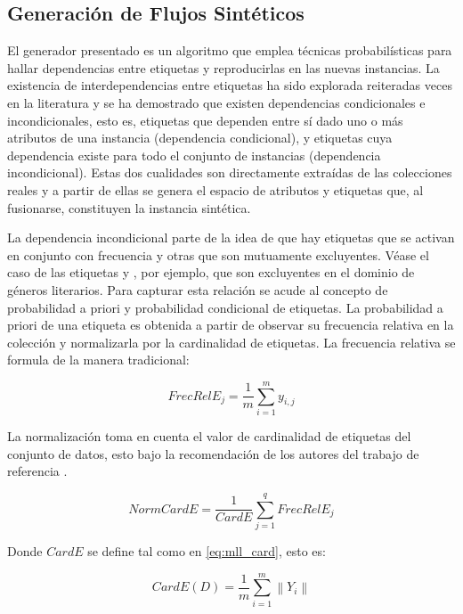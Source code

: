 \subsection{Generación de Flujos Sintéticos}
\label{generacion_flujos_sinteticos}

El generador presentado es un algoritmo que emplea técnicas probabilísticas para
hallar dependencias entre etiquetas y reproducirlas en las nuevas instancias. La
existencia de interdependencias entre etiquetas ha sido explorada reiteradas
veces en la literatura \cite{tsoumakas_multi-label_2007, read_multi-label_2008}
y se ha demostrado que existen dependencias condicionales e incondicionales,
esto es, etiquetas que dependen entre sí dado uno o más atributos de una
instancia (dependencia condicional), y etiquetas cuya dependencia existe para
todo el conjunto de instancias (dependencia incondicional). Estas dos cualidades
son directamente extraídas de las colecciones reales y a partir de ellas se
genera el espacio de atributos y etiquetas que, al fusionarse, constituyen la
instancia sintética.

La dependencia incondicional parte de la idea de que hay etiquetas que se
activan en conjunto con frecuencia y otras que son mutuamente excluyentes. Véase
el caso de las etiquetas  y , por ejemplo, que son excluyentes en el dominio de géneros literarios.
Para capturar esta relación se acude al concepto de probabilidad a priori y
probabilidad condicional de etiquetas. La probabilidad a priori de una etiqueta
es obtenida a partir de observar su frecuencia relativa en la colección y
normalizarla por la cardinalidad de etiquetas. La frecuencia relativa se formula
de la manera tradicional:

\begin{equation}
	FrecRelE_{j} = \frac{1}{m} \sum_{i=1}^{m} y_{i,j}
\end{equation}

La normalización toma en cuenta el valor de cardinalidad de etiquetas del
conjunto de datos, esto bajo la recomendación de los autores del trabajo de
referencia \cite{read_scalable_2012}.

\begin{equation}
	NormCardE = \frac{1}{CardE} \sum_{j=1}^{q} FrecRelE_{j}
\end{equation}

Donde $CardE$ se define tal como en \ref{eq:mll_card}, esto es:

\begin{equation}
	CardE(D) = \frac{1}{m} \sum_{i=1}^{m} \left\|Y_{i}\right\|
\end{equation}

